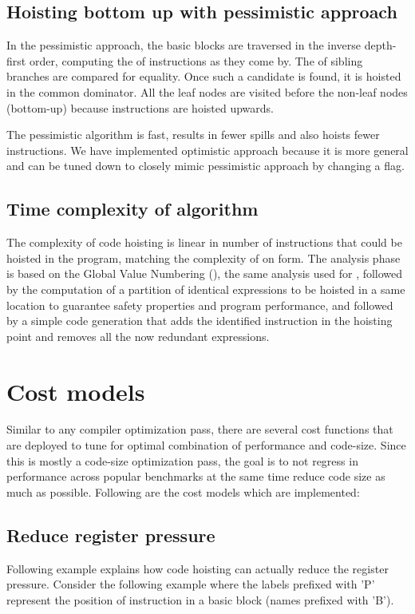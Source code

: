 \documentclass{sig-alternate}
\begin{document}
\subsection{Hoisting bottom up with pessimistic approach}
\label{subsec:pessimistic}
In the pessimistic approach, the basic blocks are traversed in the inverse
depth-first order, computing the \GVN{} of instructions as they come by. The \GVN{} of
sibling branches are compared for equality. Once such a candidate is found, it
is hoisted in the common dominator. All the leaf nodes are visited before the
non-leaf nodes (bottom-up) because instructions are hoisted upwards.

The pessimistic algorithm is fast, results in fewer spills and also hoists fewer
instructions. We have implemented optimistic approach because it is more general
and can be tuned down to closely mimic pessimistic approach by changing a flag.

\subsection{Time complexity of algorithm}
The complexity of code hoisting is linear in number of instructions that could
be hoisted in the program, matching the complexity of \PRE{} on \SSA{} form.  The
analysis phase is based on the Global Value Numbering (\GVN{}), the same analysis
used for \PRE{}, followed by the computation of a partition of identical
expressions to be hoisted in a same location to guarantee safety properties and
program performance, and followed by a simple code generation that adds the
identified instruction in the hoisting point and removes all the now redundant
expressions.

\section{Cost models}
\label{sec:cost-models}
Similar to any compiler optimization pass, there are several cost functions that
are deployed to tune for optimal combination of performance and code-size.
Since this is mostly a code-size optimization pass, the goal is to not regress
in performance across popular benchmarks at the same time reduce code size as
much as possible. Following are the cost models which are implemented:

\subsection{Reduce register pressure}
\label{hoist:reg-pressure}
Following example explains how code hoisting can actually reduce the register
pressure.  Consider the following example where the labels prefixed with 'P'
represent the position of instruction in a basic block (names prefixed with 'B').
\end{document}
